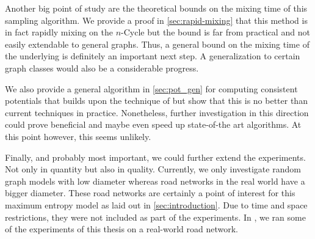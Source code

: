 Another big point of study are the theoretical bounds on the mixing time of this sampling algorithm.
We provide a proof in \cref{sec:rapid-mixing} that this method is in fact rapidly mixing on the $n$-Cycle but the bound is far from practical and not easily extendable to general graphs.
Thus, a general bound on the mixing time of the underlying \markov is definitely an important next step.
A generalization to certain graph classes would also be a considerable progress.

We also provide a general algorithm in \cref{sec:pot_gen} for computing consistent potentials that builds upon the technique of \algns but show that this is no better than current techniques in practice.
Nonetheless, further investigation in this direction could prove beneficial and maybe even speed up state-of-the art algorithms.
At this point however, this seems unlikely.

Finally, and probably most important, we could further extend the experiments.
Not only in quantity but also in quality.
Currently, we only investigate random graph models with low diameter whereas road networks in the real world have a bigger diameter.
These road networks are certainly a point of interest for this maximum entropy model as laid out in \cref{sec:introduction}.
Due to time and space restrictions, they were not included as part of the experiments.
In \cite{RNEW}, we ran some of the experiments of this thesis on a real-world road network.
